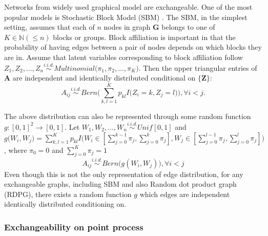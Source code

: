 \documentclass[12pt]{article}
\theoremstyle{definition}
\begin{document}
Networks from widely used graphical model are exchangeable. One of the most popular models is Stochastic Block Model (SBM) \cite{holland1983stochastic}. 
The SBM, in the simplest setting, assumes that each of $n$ nodes in graph $\boldsymbol{G}$ belongs to one of $K \in \mathbb{N} (\leq n)$ blocks or groups. Block affiliation is important in that the probability of having edges between a pair of nodes depends on which blocks they are in.  Assume that latent variables corresponding to block affiliation follow $Z_{1}, Z_{2}, ... , Z_{n} \overset{i.i.d.}{\sim} Multinomial\big( \pi_{1}, \pi_{2}, ... , \pi_{K} \big)$. Then the upper triangular entries of $\mathbf{A}$ are independent and identically distributed conditional on $\{\mathbf{Z}\}$:
	\begin{equation} 
	A_{ij} \overset{i.i.d.}{\sim} Bern\big( \sum\limits_{k,l=1}^{K} p_{kl} I\big( Z_{i} = k, Z_{j} = l  \big)    \big), \forall  i < j.
	\end{equation}

The above distribution can also be represented through some random function $g : [0,1]^2 \rightarrow [0,1]$. Let $W_{1}, W_{2}, ... , W_{n} \overset{i.i.d.}{\sim} Unif[0,1]$ and $g\big( W_{i}, W_{j} \big) = \sum\limits_{k,l=1}^{K} p_{kl} I \big( W_{i} \in [\sum\limits_{j=0}^{k-1} \pi_{j}, \sum\limits_{j=0}^{k} \pi_{j}   ] , W_{j} \in [\sum\limits_{j=0}^{l-1} \pi_{j}, \sum\limits_{j=0}^{l} \pi_{j}  ]  \big)$, where $\pi_{0} = 0$ and $\sum\limits_{j=0}^{K}  \pi_{j} = 1$ 
\begin{equation} 
A_{ij} \overset{i.i.d.}{\sim} Bern \big( g(W_{i}, W_{j})  \big), \forall i < j
\end{equation}
Even though this is not the only representation of edge distribution, for any exchangeable graphs, including SBM and also Random dot product graph (RDPG), there exists a random function $g$ which edges are independent identically distributed conditioning on.
	
\subsubsection{Exchangeability on point process}
	
\end{document}
